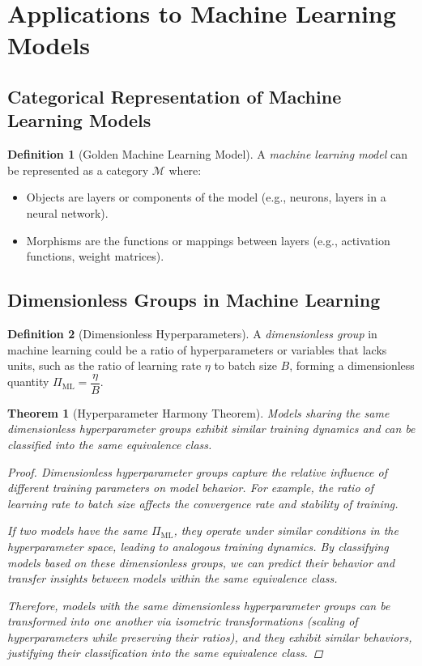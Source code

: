 \documentclass{article}
\newtheorem{theorem}{Theorem}[section]
\theoremstyle{definition}
\newtheorem{definition}{Definition}[section]
\theoremstyle{remark}
\begin{document}
	
	
	\section{Applications to Machine Learning Models}
	
	\subsection{Categorical Representation of Machine Learning Models}
	
	\begin{definition}[Golden Machine Learning Model]
		A \emph{machine learning model} can be represented as a category $\mathcal{M}$ where:
		\begin{itemize}
			\item Objects are layers or components of the model (e.g., neurons, layers in a neural network).
			\item Morphisms are the functions or mappings between layers (e.g., activation functions, weight matrices).
		\end{itemize}
	\end{definition}
	
	\subsection{Dimensionless Groups in Machine Learning}
	
	\begin{definition}[Dimensionless Hyperparameters]
		A \emph{dimensionless group} in machine learning could be a ratio of hyperparameters or variables that lacks units, such as the ratio of learning rate $\eta$ to batch size $B$, forming a dimensionless quantity $\Pi_{\text{ML}} = \dfrac{\eta}{B}$.
	\end{definition}
	
	\begin{theorem}[Hyperparameter Harmony Theorem]
		Models sharing the same dimensionless hyperparameter groups exhibit similar training dynamics and can be classified into the same equivalence class.
		
		\begin{proof}
			Dimensionless hyperparameter groups capture the relative influence of different training parameters on model behavior. For example, the ratio of learning rate to batch size affects the convergence rate and stability of training.
			
			If two models have the same $\Pi_{\text{ML}}$, they operate under similar conditions in the hyperparameter space, leading to analogous training dynamics. By classifying models based on these dimensionless groups, we can predict their behavior and transfer insights between models within the same equivalence class.
			
			Therefore, models with the same dimensionless hyperparameter groups can be transformed into one another via isometric transformations (scaling of hyperparameters while preserving their ratios), and they exhibit similar behaviors, justifying their classification into the same equivalence class.
		\end{proof}
	\end{theorem}
	
\end{document}
